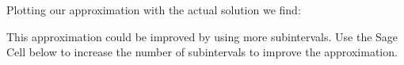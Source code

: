 \documentclass{ximera}
\begin{document}
\begin{example}
Plotting our approximation with the actual solution we find:


This approximation could be improved by using more subintervals.  Use the Sage Cell below to increase the number of subintervals to improve the approximation.

%
%
%

\end{example}
\end{document}

